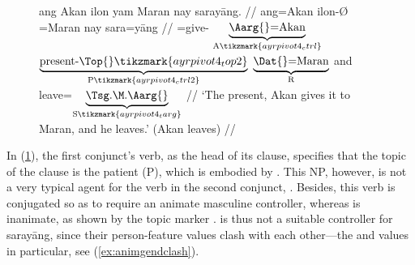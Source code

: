 \begin{figure}[h]
\ex\label{ex:ayrpivot4}\begingl[aboveglcskip=1.5em, aboveglftskip=2.5em]
	 {ang Akan} ilon {yam Maran} nay sarayāng. //
	 {ang=Akan} ilon-Ø {\Dat{}=Maran} nay sara=yāng //
	\glc \PatTI{}=give-\TsgM{}
		$\underbrace{\text{\Aarg{}=Akan}}_{\text{A}\tikzmark{ayrpivot4_ctrl}}$
		$\underbrace{\text{\smash{present}-\Top{}}\tikzmark{ayrpivot4_top2}}_%
			{\text{P}\tikzmark{ayrpivot4_ctrl2}}$
		$\underbrace{\text{\Dat{}=Maran}}_{\text{R}}$
		and
		leave=$\underbrace{\text{\smash{\TsgM{}}.\Aarg{}}}_%
			{\text{S}\tikzmark{ayrpivot4_targ}}$
		//
	\glft `The present, Akan gives it to Maran, and he leaves.' 
		(Akan leaves) //
\endgl
{}
\xe
\end{figure}

In (\ref{ex:ayrpivot4}), the first conjunct's verb, as the head of its clause,
specifies that the topic of the clause is the patient (P), which is embodied by
. This NP, however, is not a very typical agent for
the verb in the second conjunct, . Besides, this verb
is conjugated so as to require an animate masculine controller, whereas
 is inanimate, as shown by the topic marker .
 is thus not a suitable controller for 
{sarayāng}, since their person-feature values clash with each other---the 
\Anim{} and \Gend{} values in particular, see (\ref{ex:animgendclash}).

